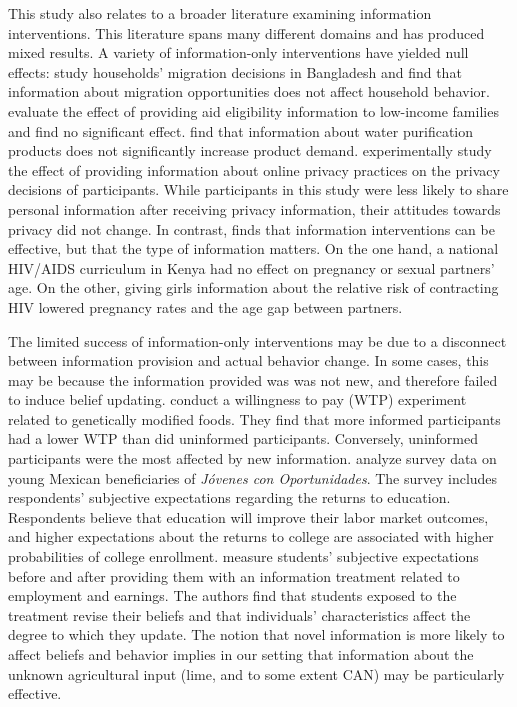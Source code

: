 \documentclass[12pt,letterpaper]{article}
\begin{document}
This study also relates to a broader literature examining information interventions. This literature spans many different domains and has produced mixed results. A variety of information-only interventions have yielded null effects: \citet{bryan_underinvestment_2014} study households' migration decisions in Bangladesh and find that information about migration opportunities does not affect household behavior. \citet{bettinger_role_2012} evaluate the effect of providing aid eligibility information to low-income families and find no significant effect.
\citet{ashraf_information_2013} find that information about water purification products does not significantly increase product demand. \citet{marreiros_now_2017} experimentally study the effect of providing information about online privacy practices on the privacy decisions of participants. While participants in this study were less likely to share personal information after receiving privacy information, their attitudes towards privacy did not change. In contrast, \citet{dupas_teenagers_2011} finds that information interventions can be effective, but that the type of information matters. On the one hand, a national HIV/AIDS curriculum in Kenya had no effect on pregnancy or sexual partners' age. On the other, giving girls information about the relative risk of contracting HIV lowered pregnancy rates and the age gap between partners. 

The limited success of information-only interventions may be due to a disconnect between information provision and actual behavior change. In some cases, this may be because the information provided was was not new, and therefore failed to induce belief updating. \citet{huffman_effects_2007} conduct a willingness to pay (WTP) experiment related to genetically modified foods. They find that more informed participants had a lower WTP than did uninformed participants. Conversely, uninformed participants were the most affected by new information. \citet{attanasio_education_2017} analyze survey data on young Mexican beneficiaries of \textit{J\'ovenes con Oportunidades}. The survey includes respondents' subjective expectations regarding the returns to education. Respondents believe that education will improve their labor market outcomes, and higher expectations about the returns to college are associated with higher probabilities of college enrollment. \citet{wiswall_how_2015} measure students' subjective expectations before and after providing them with an information treatment related to employment and earnings. The authors find that students exposed to the treatment revise their beliefs and that individuals' characteristics affect the degree to which they update. The notion that novel information is more likely to affect beliefs and behavior implies in our setting that information about the unknown agricultural input (lime, and to some extent CAN) may be particularly effective.
\end{document}
